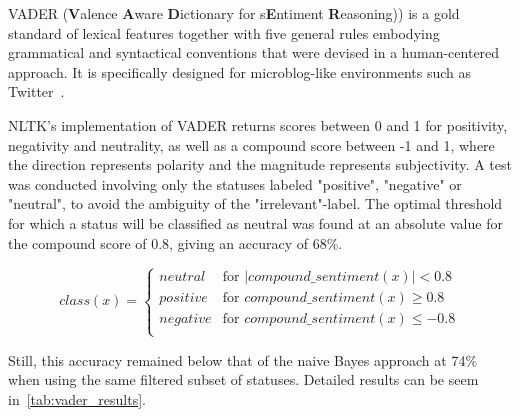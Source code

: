 VADER (\textbf{V}alence \textbf{A}ware \textbf{D}ictionary for s\textbf{E}ntiment \textbf{R}easoning))
is a gold standard of lexical features together with five general rules embodying grammatical and syntactical conventions
that were devised in a human-centered approach.
It is specifically designed for microblog-like environments such as Twitter~\cite{Hutto2014}.

NLTK's implementation of VADER returns scores between 0 and 1 for positivity, negativity and neutrality,
as well as a compound score between -1 and 1, where the direction represents polarity and the magnitude represents subjectivity.
A test was conducted involving only the statuses labeled "positive", "negative" or "neutral",
to avoid the ambiguity of the "irrelevant"-label.
The optimal threshold for which a status will be classified as neutral was found
at an absolute value for the compound score of 0.8, giving an accuracy of 68\%.

\begin{equation}
    class(x) =
    \begin{cases}
        neutral & \text{for } |compound\_sentiment(x)| < 0.8 \\
        positive & \text{for } compound\_sentiment(x) \geq 0.8 \\
        negative & \text{for } compound\_sentiment(x) \leq -0.8 \\
    \end{cases}
\end{equation}

Still, this accuracy remained below that of the naive Bayes approach at 74\% when using the same filtered subset of statuses.
Detailed results can be seem in~\cref{tab:vader_results}.

